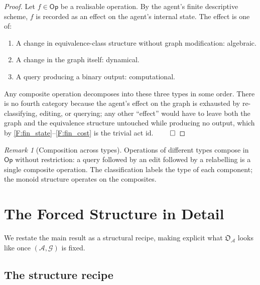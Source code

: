 \documentclass[11pt,a4paper]{article}
\theoremstyle{thmstyle}
\theoremstyle{definition}
\theoremstyle{remark}
\newtheorem{remark}[theorem]{Remark}
\newcommand{\Graph}{\mathcal{G}}
\newcommand{\Agent}{\mathcal{A}}
\newcommand{\Op}{\mathsf{Op}}
\newcommand{\OpStr}{\mathfrak{O}}
\begin{document}
\begin{proof}
Let $f \in \Op$ be a realisable operation. By the agent's finite
descriptive scheme, $f$ is recorded as an effect on the agent's
internal state. The effect is one of:
\begin{enumerate}[nosep,leftmargin=*]
\item A change in equivalence-class structure without graph
modification: algebraic.
\item A change in the graph itself: dynamical.
\item A query producing a binary output: computational.
\end{enumerate}
Any composite operation decomposes into these three types in some
order. There is no fourth category because the agent's effect on
the graph is exhausted by re-classifying, editing, or querying;
any other ``effect'' would have to leave both the graph and the
equivalence structure untouched while producing no output, which by
\ref{F:fin_state}--\ref{F:fin_cost} is the trivial act
$\mathrm{id}$. $\qed$
\end{proof}

\begin{remark}[Composition across types]
\label{rem:cross_type}
Operations of different types compose in $\Op$ without restriction:
a query followed by an edit followed by a relabelling is a single
composite operation. The classification labels the type of each
component; the monoid structure operates on the composites.
\end{remark}

\section{The Forced Structure in Detail}
\label{sec:detail}

We restate the main result as a structural recipe, making explicit
what $\OpStr_\Agent$ looks like once $(\Agent, \Graph)$ is fixed.

\subsection{The structure recipe}
\end{document}
